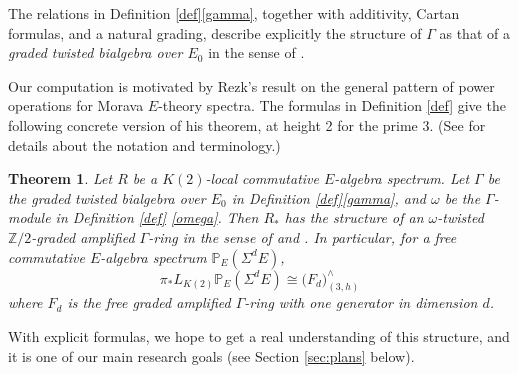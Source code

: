 \documentclass{rs}
\newtheorem{thm}{Theorem}
\theoremstyle{definition}
\theoremstyle{remark}
\newcommand{\mb}[1]{\mathbb{#1}}
\newcommand{\BP}{{\mb P}}
\newcommand{\BZ}{{\mb Z}}
\newcommand{\G}{\Gamma}
\begin{document}
The relations in Definition \ref{def}\thinspace \eqref{gamma}, together with additivity, Cartan formulas, and a natural grading, 
describe explicitly the structure of $\G$ as that of a {\em graded twisted bialgebra over $E_0$} in the sense of \cite[Section 5]{cong}.  

Our computation is motivated by Rezk's result \cite{cong, h2p2} on the general pattern of power operations for Morava $E$-theory spectra.  
The formulas in Definition \ref{def} give the following concrete version of his theorem, at height 2 for the prime 3.  
(See \cite{cong, h2p2} for details about the notation and terminology.)  

\begin{thm}
 Let $R$ be a $K(2)$-local commutative $E$-algebra spectrum.  
 Let $\G$ be the graded twisted bialgebra over $E_0$ in Definition \ref{def}\thinspace \eqref{gamma}, 
 and $\omega$ be the $\G$-module in Definition \ref{def} \eqref{omega}.  
 Then $R_*$ has the structure of an {\em $\omega$-twisted $\BZ/2$-graded amplified $\G$-ring} in the sense of \cite[Section 2]{cong} and \cite[2.5 and 2.6]{h2p2}.  
 In particular, for a free commutative $E$-algebra spectrum $\BP_E (\Sigma^d E)$, 
 \[
  \pi_* L_{K(2)} \BP_E (\Sigma^d E) \cong \big( F_d \big)_{(3,h)}^\wedge 
 \]
 where $F_d$ is the free graded amplified $\G$-ring with one generator in dimension $d$.  
\end{thm}

With explicit formulas, we hope to get a real understanding of this structure, and it is one of our main research goals (see Section \ref{sec:plans} below).  
\end{document}
